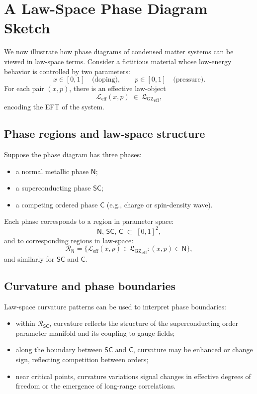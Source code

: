\documentclass[11pt]{book}
\newcommand{\GZLS}{\ensuremath{\mathfrak{L}_{\mathrm{GZ}}}}
\theoremstyle{plain}
\theoremstyle{definition}
\theoremstyle{remark}
\begin{document}
\section{A Law-Space Phase Diagram Sketch}
\label{sec:example-phase-diagram}


We now illustrate how phase diagrams of condensed matter systems can
be viewed in law-space terms. Consider a fictitious material whose
low-energy behavior is controlled by two parameters:
\[
   x \in [0,1] \quad \text{(doping)},\qquad
   p \in [0,1] \quad \text{(pressure)}.
\]
For each pair $(x,p)$, there is an effective law-object
\[
   \mathcal{L}_{\mathrm{eff}}(x,p) \;\in\; {\GZLS}_{\mathrm{eff}},
\]
encoding the EFT of the system.

\subsection*{Phase regions and law-space structure}

Suppose the phase diagram has three phases:
\begin{itemize}
  \item a normal metallic phase $\mathsf{N}$;
  \item a superconducting phase $\mathsf{SC}$;
  \item a competing ordered phase $\mathsf{C}$ (e.g., charge or
        spin-density wave).
\end{itemize}

Each phase corresponds to a region in parameter space:
\[
   \mathsf{N},\,\mathsf{SC},\,\mathsf{C} \;\subset\; [0,1]^2,
\]
and to corresponding regions in law-space:
\[
   \mathcal{R}_{\mathsf{N}} = \{\mathcal{L}_{\mathrm{eff}}(x,p)\in
   {\GZLS}_{\mathrm{eff}} : (x,p)\in\mathsf{N}\},
\]
and similarly for $\mathsf{SC}$ and $\mathsf{C}$.

\subsection*{Curvature and phase boundaries}

Law-space curvature patterns can be used to interpret phase
boundaries:
\begin{itemize}
  \item within $\mathcal{R}_{\mathsf{SC}}$, curvature reflects the
        structure of the superconducting order parameter manifold
        and its coupling to gauge fields;
  \item along the boundary between $\mathsf{SC}$ and $\mathsf{C}$,
        curvature may be enhanced or change sign, reflecting
        competition between orders;
  \item near critical points, curvature variations signal changes
        in effective degrees of freedom or the emergence of
        long-range correlations.
\end{itemize}
\end{document}
